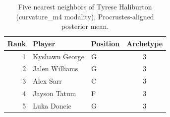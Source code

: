 \begin{table}[htbp]
  \centering\small
  \begin{tabular}{rllc}
    \toprule
    Rank & Player & Position & Archetype \\
    \midrule
    1 & Kyshawn George & G & 3 \\
    2 & Jalen Williams & G & 3 \\
    3 & Alex Sarr & C & 3 \\
    4 & Jayson Tatum & F & 3 \\
    5 & Luka Doncic & G & 3 \\
    \bottomrule
  \end{tabular}
  \caption{Five nearest neighbors of Tyrese Haliburton (curvature_m4 modality), Procrustes-aligned posterior mean.}
  \label{tab:Tyrese_Haliburton_neighbors_curvature_m4}
\end{table}

